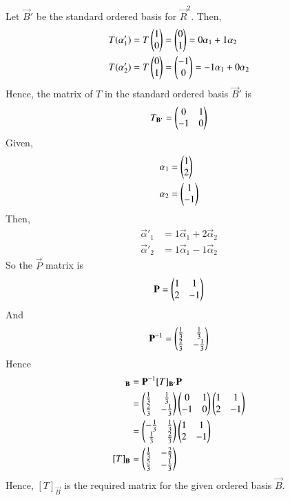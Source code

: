
	Let $\vec{B}'$ be the standard ordered basis for $\vec{R}^2$. Then,
	\begin{align}
		T(\mathbf{\alpha}'_1) &= T\begin{pmatrix}1 \\ 0\end{pmatrix} = \begin{pmatrix}0\\1\end{pmatrix} = 0\mathbf{\alpha}_1 + 1\mathbf{\alpha}_2\\
		T(\mathbf{\alpha}'_2) &= T\begin{pmatrix}0 \\ 1\end{pmatrix} = \begin{pmatrix}-1\\0\end{pmatrix} = -1\mathbf{\alpha}_1 + 0\mathbf{\alpha}_2
	\end{align}
Hence, the matrix of $T$ in the standard ordered basis $\vec{B}'$ is
\begin{align}
	T_\mathbf{B'} = \begin{pmatrix}0 & 1\\ -1 & 0\end{pmatrix}
\end{align}
Given, 
\begin{align}
	\mathbf{\alpha}_1 &= \begin{pmatrix}1\\ 2\end{pmatrix} \\ 
	\mathbf{\alpha}_2 &= \begin{pmatrix}1 \\ -1\end{pmatrix} 
\end{align}
Then,
\begin{align}
	\vec{\alpha}'_1 &= 1\vec{\alpha}_1 + 2\vec{ \alpha }_2\\
	\vec{\alpha}'_2 &= 1\vec{\alpha}_1 - 1\vec{ \alpha }_2
\end{align}		
So the $\vec{P}$ matrix is
\begin{align}
	\mathbf{P} = \begin{pmatrix}1 & 1\\ 2 & -1\end{pmatrix}
\end{align}	
And
\begin{align}
	\mathbf{P}^{-1} = \begin{pmatrix}\frac{1}{3} & \frac{1}{3} \\ \frac{2}{3} & -\frac{1}{3}\end{pmatrix}
\end{align}
Hence
\begin{align}
	[T]_\vec{B} &= \vec{P}^{-1} [T]_\vec{B'} \vec{P}\\
	&= \myvec{\frac{1}{3} & \frac{1}{3} \\ \frac{2}{3} & -\frac{1}{3}}\myvec{0 & 1\\ -1 & 0}\myvec{1 & 1\\ 2 & -1}\\
	&= \myvec{-\frac{1}{3} & \frac{1}{3} \\ \frac{1}{3} & \frac{2}{3}}\myvec{1 & 1\\ 2 & -1}\\
	[T]_\vec{B} &= \myvec{\frac{1}{3} & -\frac{2}{3} \\ \frac{5}{3} & -\frac{1}{3}}
\end{align}	
Hence, $[T]_\vec{B}$ is the required matrix for the given ordered basis $\vec{B}$.
